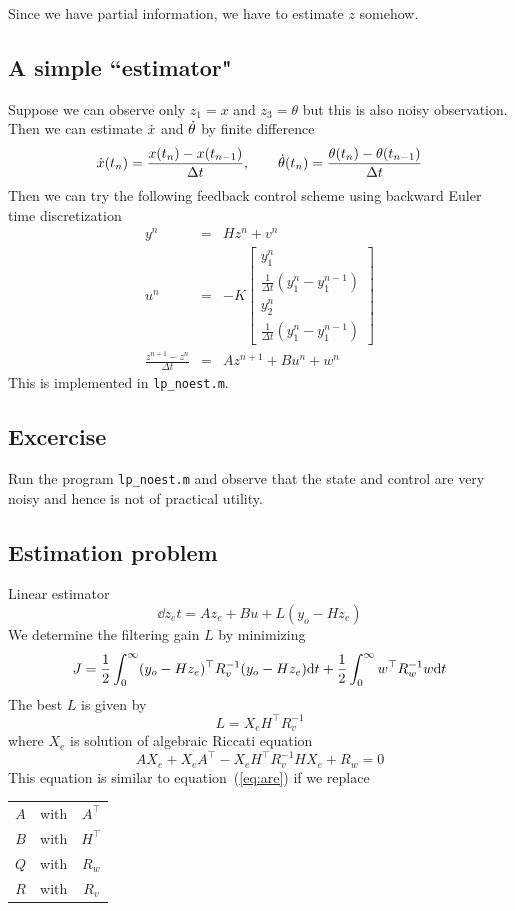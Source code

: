 \documentclass[12pt]{article}
\begin{document}
Since we have partial information, we have to estimate $z$ somehow.
\subsection{A simple ``estimator"}
Suppose we can observe only $z_1 = x$ and $z_3 = \theta$ but this is also noisy observation. Then we can estimate $\dot{x}$ and $\dot{\theta}$ by finite difference
\[
\dot{x}(t_n) = \frac{x(t_n) - x(t_{n-1})}{\Delta t}, \qquad \dot{\theta}(t_n) = \frac{\theta(t_n) - \theta(t_{n-1})}{\Delta t}
\]
Then we can try the following feedback control scheme using backward Euler time discretization
\begin{eqnarray*}
y^n &=& H z^n + v^n \\
u^n &=& - K \begin{bmatrix}
y_1^n \\
\frac{1}{\Delta t}(y_1^n - y_1^{n-1}) \\
y_2^n \\
\frac{1}{\Delta t}(y_1^n - y_1^{n-1})
\end{bmatrix} \\
\frac{z^{n+1} - z^n}{\Delta t} &=& A z^{n+1} + B u^n + w^n
\end{eqnarray*}
This is implemented in {\tt lp\_noest.m}.
\subsection{Excercise}
Run the program {\tt lp\_noest.m} and observe that the state and control are very noisy and hence is not of practical utility.
\subsection{Estimation problem}
Linear estimator
\[
\dd{z_e}{t} = A z_e + Bu + L(y_o - H z_e)
\]
We determine the filtering gain $L$ by minimizing
\[
J = \frac{1}{2} \int_0^\infty (y_o - H z_e)^\top R_v^{-1} (y_o - H z_e) \textrm{d} t +            \frac{1}{2} \int_0^\infty w^\top R_w^{-1} w \textrm{d} t
\]
The best $L$ is given by
\begin{equation}
L = X_e H^\top R_v^{-1}
\label{eq:L}
\end{equation}
where $X_e$ is solution of algebraic Riccati equation
\[
A X_e + X_e A^\top - X_e H^\top R_v^{-1}  H X_e + R_w = 0
\]
This equation is similar to equation~(\ref{eq:are}) if we replace 
\begin{center}
\begin{tabular}{ccc}
$A$ & with & $A^\top$ \\
$B$ & with & $H^\top$ \\
$Q$ & with & $R_w$ \\
$R$ & with & $R_v$
\end{tabular}
\end{center}
\end{document}
